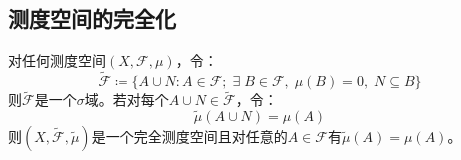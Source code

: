 \subsection{测度空间的完全化}
\begin{theorem}
	对任何测度空间$(X,\mathscr{F},\mu)$，令：
	\begin{equation*}
		\tilde{\mathscr{F}}\coloneq\{A\cup N:A\in\mathscr{F};\;\exists\;B\in\mathscr{F},\;\mu(B)=0,\;N\subseteq B\}
	\end{equation*}
	则$\tilde{\mathscr{F}}$是一个$\sigma$域。若对每个$A\cup N\in\tilde{\mathscr{F}}$，令：
	\begin{equation*}
		\tilde{\mu}(A\cup N)=\mu(A)
	\end{equation*}
	则$(X,\tilde{\mathscr{F}},\tilde{\mu})$是一个完全测度空间且对任意的$A\in\mathscr{F}$有$\tilde{\mu}(A)=\mu(A)$。
\end{theorem}

